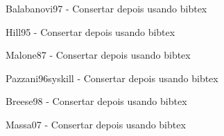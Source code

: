 \begin{thebibliography}{99}
 Balabanovi97 - Consertar depois usando bibtex

 Hill95 - Consertar depois usando bibtex

 Malone87 - Consertar depois usando bibtex

 Pazzani96syskill - Consertar depois usando bibtex

 Breese98 - Consertar depois usando bibtex


 Massa07 - Consertar depois usando bibtex


\end{thebibliography}
